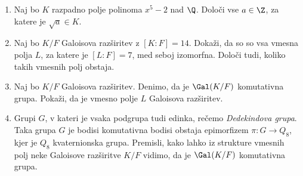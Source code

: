 \begin{enumerate}
    \item Naj bo $K$ razpadno polje polinoma $x^5 - 2$ nad $\Q$. Določi vse $a \in \Z$, za katere je $\sqrt{a} \in K$.
    \item Naj bo $K/F$ Galoisova razširitev z $[K:F] = 14$. Dokaži, da so so vsa vmesna polja $L$, za katere je 
    $[L:F] = 7$, med seboj izomorfna. Določi tudi, koliko takih vmesnih polj obstaja.
    \item Naj bo $K/F$ Galoisova razširitev. Denimo, da je $\Gal(K/F)$ komutativna grupa. Pokaži, da je 
    vmesno polje $L$ Galoisova razširitev.
    \item Grupi $G$, v kateri je vsaka podgrupa tudi edinka, rečemo \emph{Dedekindova grupa}.
    Taka grupa $G$ je bodisi komutativna bodisi obstaja epimorfizem $\pi \colon G \to Q_8$, kjer je $Q_8$ 
    kvaternionska grupa. Premisli, kako lahko iz strukture vmesnih polj neke Galoisove razširitve $K/F$ vidimo, 
    da je $\Gal(K/F)$ komutativna grupa.
\end{enumerate}

%

%

%
